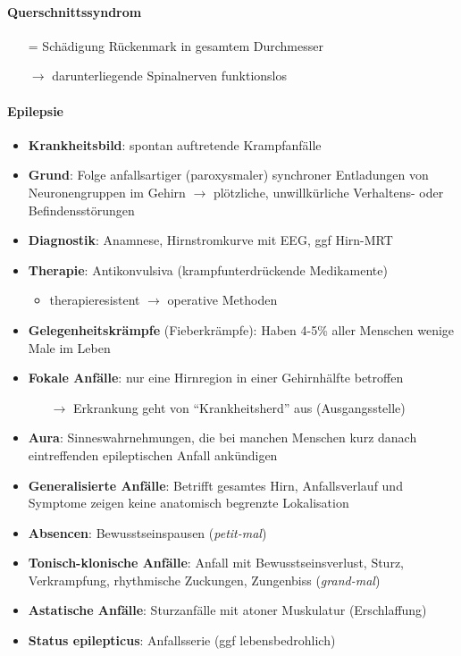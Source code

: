 \paragraph{Querschnittssyndrom}
\begin{itemize}
  \item[=] Schädigung Rückenmark in gesamtem Durchmesser
  \item[\( \to \)] darunterliegende Spinalnerven funktionslos 
\end{itemize}

\paragraph{Epilepsie}
\begin{itemize}
  \item \textbf{Krankheitsbild}: spontan auftretende Krampfanfälle
  \item \textbf{Grund}: Folge anfallsartiger (paroxysmaler) synchroner Entladungen von Neuronengruppen im Gehirn \( \to \) plötzliche, unwillkürliche Verhaltens- oder Befindensstörungen
  \item \textbf{Diagnostik}: Anamnese, Hirnstromkurve mit EEG, ggf Hirn-MRT
  \item \textbf{Therapie}: Antikonvulsiva (krampfunterdrückende Medikamente)
  \begin{itemize}
    \item therapieresistent \( \to \) operative Methoden
  \end{itemize}
  \item \textbf{Gelegenheitskrämpfe} (Fieberkrämpfe): Haben 4-5\% aller Menschen wenige Male im Leben
  \item \textbf{Fokale Anfälle}: nur eine Hirnregion in einer Gehirnhälfte betroffen
  \begin{itemize}
    \item[\( \to \)] Erkrankung geht von ``Krankheitsherd'' aus (Ausgangsstelle)
  \end{itemize}
  \item \textbf{Aura}: Sinneswahrnehmungen, die bei manchen Menschen kurz danach eintreffenden epileptischen Anfall ankündigen
  \item \textbf{Generalisierte Anfälle}: Betrifft gesamtes Hirn, Anfallsverlauf und Symptome zeigen keine anatomisch begrenzte Lokalisation
  \item \textbf{Absencen}: Bewusstseinspausen (\emph{petit-mal})
  \item \textbf{Tonisch-klonische Anfälle}: Anfall mit Bewusstseinsverlust, Sturz, Verkrampfung, rhythmische Zuckungen, Zungenbiss (\emph{grand-mal})
  \item \textbf{Astatische Anfälle}: Sturzanfälle mit atoner Muskulatur (Erschlaffung)
  \item \textbf{Status epilepticus}: Anfallsserie (ggf lebensbedrohlich)
\end{itemize}

